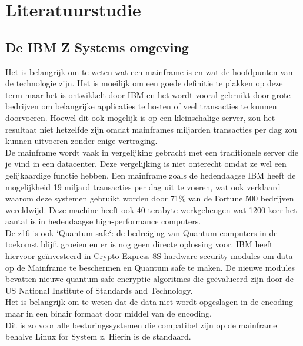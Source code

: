 
\chapter{Literatuurstudie}
\label{ch:literatuurstudie}

\section{De IBM Z Systems omgeving}
\label{sec:De IBM Z Systems omgeving}
Het is belangrijk om te weten wat een mainframe is en wat de hoofdpunten van de technologie zijn. Het is moeilijk om een goede definitie te plakken op deze term maar het is ontwikkelt door IBM en het wordt vooral gebruikt door grote bedrijven om belangrijke applicaties te hosten of veel transacties te kunnen doorvoeren. Hoewel dit ook mogelijk is op een kleinschalige server, zou het resultaat niet hetzelfde zijn omdat mainframes miljarden transacties per dag zou kunnen uitvoeren zonder enige vertraging. \autocite{BasuMallick2023} \\

De mainframe wordt vaak in vergelijking gebracht met een traditionele server die je vind in een datacenter. Deze vergelijking is niet onterecht omdat ze wel een gelijkaardige functie hebben. Een mainframe zoals de hedendaagse IBM  heeft de mogelijkheid 19 miljard transacties per dag uit te voeren, wat ook verklaard waarom deze systemen gebruikt worden door 71\% van de Fortune 500 bedrijven wereldwijd. Deze machine heeft ook 40 terabyte werkgeheugen wat 1200 keer het aantal is in hedendaagse high-performance computers. \autocite{Tozzi2022} \\

De \Gls{z16} is ook `Quantum safe`: de bedreiging van Quantum computers in de toekomst blijft groeien en er is nog geen directe oplossing voor. IBM heeft hiervoor geïnvesteerd in Crypto Express 8S hardware security modules om data op de Mainframe te beschermen en Quantum safe te maken. De nieuwe modules bevatten nieuwe quantum safe encryptie algoritmes die geëvalueerd zijn door de US National Institute of Standards and Technology. \autocite{Sayer2022} \\

Het is belangrijk om te weten dat de data niet wordt opgeslagen in de  encoding maar in een binair formaat door middel van de  encoding. \autocite{Singhal2023} \\ Dit is zo voor alle besturingssystemen die compatibel zijn op de mainframe behalve Linux for System z. Hierin is  de standaard. \autocite{IBMb}


